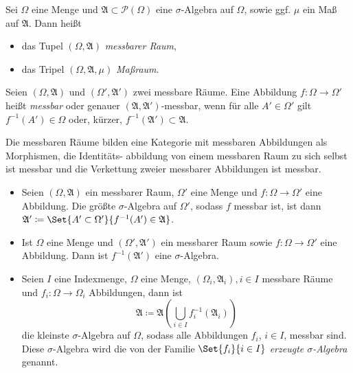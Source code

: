 \documentclass{cheat-sheet}
\newcommand{\PS}{\mathcal{P}} %
\newcommand{\PSO}{\PS(\Omega)} %
\newcommand{\Alg}{\mathfrak{A}} %
\theoremstyle{definition}
\begin{document}
\begin{defn}
  Sei $\Omega$ eine Menge und $\Alg \subset \PSO$ eine $\sigma$-Algebra auf $\Omega$, sowie ggf. $\mu$ ein Maß auf $\Alg$. Dann heißt
  \begin{itemize}
    \item das Tupel $(\Omega, \Alg)$ \emph{messbarer Raum},
    \item das Tripel $(\Omega, \Alg, \mu)$ \emph{Maßraum}.
  \end{itemize}
\end{defn}


\begin{defn}
  Seien $(\Omega, \Alg)$ und $(\Omega', \Alg')$ zwei messbare Räume. Eine Abbildung $f : \Omega \to \Omega'$ heißt \emph{messbar} oder genauer $(\Alg, \Alg')$-messbar, wenn für alle $A' \in \Omega'$ gilt $f^{-1}(A') \in \Omega$ oder, kürzer, $f^{-1}(\Alg') \subset \Alg$.
\end{defn}

\begin{bem}
  Die messbaren Räume bilden eine Kategorie mit messbaren Abbildungen als Morphismen, \dh{} die Identitäts- abbildung von einem messbaren Raum zu sich selbst ist messbar und die Verkettung zweier messbarer Abbildungen ist messbar.
\end{bem}


\begin{satz}
  \begin{itemize}
    \item Seien $(\Omega, \Alg)$ ein messbarer Raum, $\Omega'$ eine Menge und $f : \Omega \to \Omega'$ eine Abbildung. Die größte $\sigma$-Algebra auf $\Omega'$, sodass $f$ messbar ist, ist dann $\Alg' \coloneqq \Set{ A' \subset \Omega' }{ f^{-1}(A') \in \Alg }$.
    \item Ist $\Omega$ eine Menge und $(\Omega', \Alg')$ ein messbarer Raum sowie $f : \Omega \to \Omega'$ eine Abbildung. Dann ist $f^{-1}(\Alg')$ eine $\sigma$-Algebra.
    \item Seien $I$ eine Indexmenge, $\Omega$ eine Menge, $(\Omega_i, \Alg_i), i \in I$ messbare Räume und $f_i : \Omega \to \Omega_i$ Abbildungen, dann ist
    \[ \Alg \coloneqq \Alg\left( \bigcup_{i \in I} f_i^{-1}(\Alg_i) \right) \]
    die kleinste $\sigma$-Algebra auf $\Omega$, sodass alle Abbildungen $f_i$, $i \in I$, messbar sind. Diese $\sigma$-Algebra wird die von der Familie $\Set{ f_i }{i \in I}$ \emph{erzeugte $\sigma$-Algebra} genannt.
  \end{itemize}
\end{satz}
\end{document}
